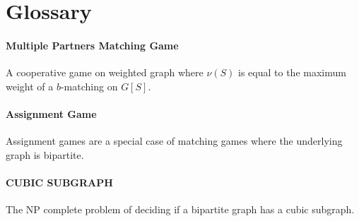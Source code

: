 \section{Glossary}
\paragraph{Multiple Partners Matching Game} A cooperative game on weighted graph where $\nu(S)$ is equal to the maximum weight of a $b$-matching on $G[S]$.
\paragraph{Assignment Game} Assignment games are a special case of matching games where the underlying graph is bipartite.
\paragraph{CUBIC SUBGRAPH}
The NP complete problem of deciding if a bipartite graph has a cubic subgraph.